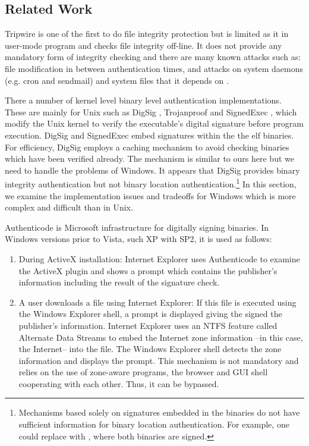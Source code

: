 \subsection{Related Work}
\label{sec:binauth-related}

Tripwire \cite{kim1994design} is one of the first to do file integrity protection
but is limited as it in user-mode program and 
checks file integrity off-line.
It does not provide any mandatory form of integrity checking and
there are many known attacks such as:
file modification in between authentication times,
and attacks on system daemons (e.g. cron and sendmail)
and system files that it depends on \cite{arnold2001trouble,slaviero2005attacking}.

There a number of kernel level binary level authentication implementations.
These are mainly for Unix
such as DigSig \cite{apvrille2004digsig}, Trojanproof \cite{williams2002anti}
and SignedExec \cite{doorn01signedexecutables}, which modify the Unix kernel
to verify the executable's digital signature before program execution.
DigSig and SignedExec embed signatures within the the elf binaries.
For efficiency, DigSig employs a caching mechanism to avoid checking
binaries which have been verified already. The mechanism is similar 
to ours here but we need to handle the problems of Windows.
It appears that DigSig provides binary integrity authentication
but not binary location authentication.\footnote{Mechanisms based solely on
signatures embedded in the binaries do not have sufficient information
for binary location authentication.
For example, one could replace  with , where both
binaries are signed.
}
In this section, we examine the implementation issues and tradeoffs
for Windows which is more complex and difficult than in Unix.

Authenticode \cite{authenticode} is Microsoft infrastructure
for digitally signing binaries.
In Windows versions prior to Vista, such XP with SP2,
it is used as follows:
\begin{enumerate}
\item During ActiveX installation:
Internet Explorer uses Authenticode to examine the ActiveX plugin 
and shows a prompt which contains the publisher's information
including the result of the signature check.
\item A user downloads a file using Internet Explorer:
If this file is executed using the Windows Explorer shell,
a prompt is displayed giving the signed the publisher's information.
Internet Explorer uses an NTFS feature called
Alternate Data Streams to embed the Internet zone information --in this case,
the Internet-- into the file.
The Windows Explorer shell detects the zone information and displays the prompt.
This mechanism is not mandatory and relies on the use of zone-aware programs,
the browser and GUI shell cooperating with each other.
Thus, it can be bypassed.
\end{enumerate}

